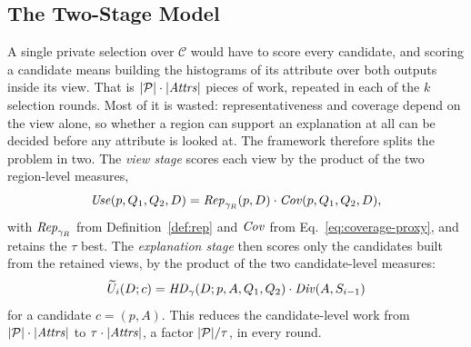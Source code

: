 
\subsection{The Two-Stage Model}
\label{subsec:two-stages}

A single private selection over $\mathcal{C}$ would have to score every candidate, and scoring a candidate means building the histograms of its attribute over both outputs inside its view.
That is $|\mathcal{P}|\cdot|\mathit{Attrs}|$ pieces of work, repeated in each of the $k$ selection rounds.
Most of it is wasted: representativeness and coverage depend on the view alone, so whether a region can support an explanation at all can be decided before any attribute is looked at.
The framework therefore splits the problem in two.
The \emph{view stage} scores each view by the product of the two region-level measures,
\begin{equation}
\mathit{Use}(p,Q_1,Q_2,D)= \mathit{Rep}_{\gamma_R}(p,D)\cdot \mathit{Cov}(p,Q_1,Q_2,D),
\label{eq:usefulness-proxy}
\end{equation}
with $\mathit{Rep}_{\gamma_R}$ from Definition~\ref{def:rep} and $\mathit{Cov}$ from Eq.~\eqref{eq:coverage-proxy}, and retains the $\tau$ best.
The \emph{explanation stage} then scores only the candidates built from the retained views, by the product of the two candidate-level measures:
\begin{equation}
\widetilde{U}_i(D;c)=\mathit{HD}_{\gamma}(D;p,A,Q_1,Q_2)\cdot \mathit{Div}(A,S_{i-1})
\label{eq:selection-utility}
\end{equation}
for a candidate $c=(p,A)$.
This reduces the candidate-level work from $|\mathcal{P}|\cdot|\mathit{Attrs}|$ to $\tau\cdot|\mathit{Attrs}|$, a factor $|\mathcal{P}|/\tau$, in every round.

